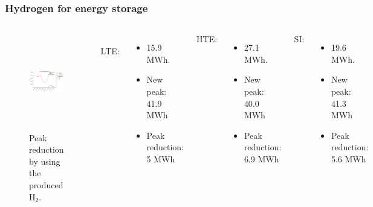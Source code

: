 \begin{frame}
\frametitle{Hydrogen for energy storage}
\begin{columns}
    \column[t]{6.5cm}
	\begin{figure}[htbp!]
		\begin{center}
			\includegraphics[height=4.2cm]{images/uiuc-hydro3B}
		\end{center}
		\caption{Peak reduction by using the produced H$_2$.}
	\end{figure}

    \column[t]{4.5cm}
    \\
    LTE:
    \begin{itemize}
 		\item 15.9 MWh.
 		\item New peak: 41.9 MWh
 		\item Peak reduction: 5 MWh
 	\end{itemize}

    HTE:
    \begin{itemize}
		\item 27.1 MWh.
		\item New peak: 40.0 MWh
        \item Peak reduction: 6.9 MWh
 	\end{itemize}

    SI:
    \begin{itemize}
		\item 19.6 MWh.
		\item New peak: 41.3 MWh
        \item Peak reduction: 5.6 MWh
 	\end{itemize}

\end{columns}
\end{frame}